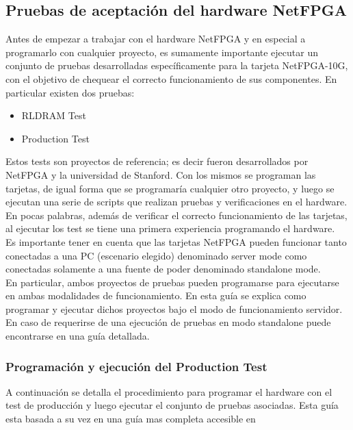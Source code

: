\subsection{Pruebas de aceptación del hardware NetFPGA}
Antes de empezar a trabajar con el hardware NetFPGA y en especial a programarlo con cualquier proyecto, es sumamente importante ejecutar un conjunto de pruebas desarrolladas específicamente para la tarjeta NetFPGA-10G, con el objetivo de chequear el correcto funcionamiento de sus componentes. En particular existen dos pruebas:

\begin{itemize}
\item RLDRAM Test\citep{NetFPGA5}
\item Production Test\citep{NetFPGA7}
\end{itemize}

Estos tests son proyectos de referencia; es decir fueron desarrollados por NetFPGA y la universidad de Stanford. Con los mismos se programan las tarjetas, de igual forma que se programaría cualquier otro proyecto, y luego se ejecutan una serie de scripts que realizan pruebas y verificaciones en el hardware. En pocas palabras, además de verificar el correcto funcionamiento de las tarjetas, al ejecutar los test se tiene una primera experiencia programando el hardware.\\

Es importante tener en cuenta que las tarjetas NetFPGA pueden funcionar tanto conectadas a una PC (escenario elegido) denominado server mode como conectadas solamente a una fuente de poder denominado standalone mode.\\

En particular, ambos proyectos de pruebas pueden programarse para ejecutarse en ambas modalidades de funcionamiento. En esta guía se explica como programar y ejecutar dichos proyectos bajo el modo de funcionamiento servidor. En caso de requerirse de una ejecuci\'on de pruebas en modo standalone puede encontrarse en\citep{NetFPGA6}\citep{NetFPGA8} una guía detallada.

\subsubsection{Programación y ejecución del Production Test}
A continuación se detalla el procedimiento para programar el hardware con el test de producción y luego ejecutar el conjunto de pruebas asociadas. Esta guía esta basada a su vez en una guía mas completa accesible en\citep{NetFPGA6}\\

